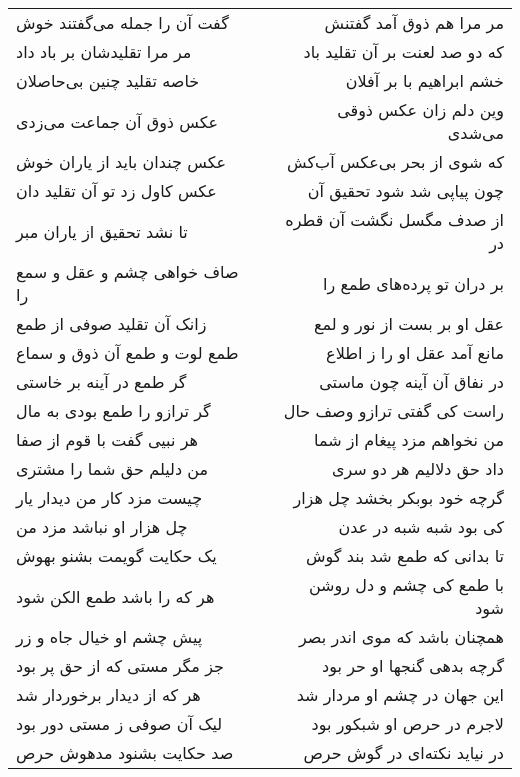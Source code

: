 \begin{center}
\begin{longtable}{l p{0.5cm} r}
گفت آن را جمله می‌گفتند خوش
&&
مر مرا هم ذوق آمد گفتنش
\\
مر مرا تقلیدشان بر باد داد
&&
که دو صد لعنت بر آن تقلید باد
\\
خاصه تقلید چنین بی‌حاصلان
&&
خشم ابراهیم با بر آفلان
\\
عکس ذوق آن جماعت می‌زدی
&&
وین دلم زان عکس ذوقی می‌شدی
\\
عکس چندان باید از یاران خوش
&&
که شوی از بحر بی‌عکس آب‌کش
\\
عکس کاول زد تو آن تقلید دان
&&
چون پیاپی شد شود تحقیق آن
\\
تا نشد تحقیق از یاران مبر
&&
از صدف مگسل نگشت آن قطره در
\\
صاف خواهی چشم و عقل و سمع را
&&
بر دران تو پرده‌های طمع را
\\
زانک آن تقلید صوفی از طمع
&&
عقل او بر بست از نور و لمع
\\
طمع لوت و طمع آن ذوق و سماع
&&
مانع آمد عقل او را ز اطلاع
\\
گر طمع در آینه بر خاستی
&&
در نفاق آن آینه چون ماستی
\\
گر ترازو را طمع بودی به مال
&&
راست کی گفتی ترازو وصف حال
\\
هر نبیی گفت با قوم از صفا
&&
من نخواهم مزد پیغام از شما
\\
من دلیلم حق شما را مشتری
&&
داد حق دلالیم هر دو سری
\\
چیست مزد کار من دیدار یار
&&
گرچه خود بوبکر بخشد چل هزار
\\
چل هزار او نباشد مزد من
&&
کی بود شبه شبه در عدن
\\
یک حکایت گویمت بشنو بهوش
&&
تا بدانی که طمع شد بند گوش
\\
هر که را باشد طمع الکن شود
&&
با طمع کی چشم و دل روشن شود
\\
پیش چشم او خیال جاه و زر
&&
همچنان باشد که موی اندر بصر
\\
جز مگر مستی که از حق پر بود
&&
گرچه بدهی گنجها او حر بود
\\
هر که از دیدار برخوردار شد
&&
این جهان در چشم او مردار شد
\\
لیک آن صوفی ز مستی دور بود
&&
لاجرم در حرص او شبکور بود
\\
صد حکایت بشنود مدهوش حرص
&&
در نیاید نکته‌ای در گوش حرص
\\
\end{longtable}
\end{center}
